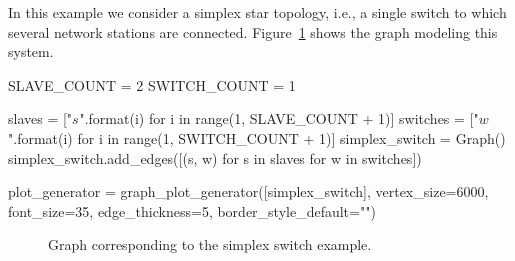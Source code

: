 \documentclass[times,a4paper,10pt,twocolumn]{article}
\theoremstyle{definition}
\theoremstyle{definition}
\theoremstyle{plain}
\begin{document}
In this example we consider a simplex star topology, i.e., a single switch to
which several network stations are connected. Figure~\ref{fig:simplex-switch}
shows the graph modeling this system.


\begin{sagesilent}

SLAVE_COUNT = 2
SWITCH_COUNT = 1

slaves = ["$s_{}$".format(i) for i in range(1, SLAVE_COUNT + 1)]
switches = ["$w_{}$".format(i) for i in range(1, SWITCH_COUNT + 1)]
simplex_switch = Graph()
simplex_switch.add_edges([(s, w) for s in slaves for w in switches])

plot_generator = graph_plot_generator([simplex_switch], vertex_size=6000,
    font_size=35, edge_thickness=5, border_style_default="")
\end{sagesilent}

\begin{figure}
\centering
{}
\caption{Graph corresponding to the simplex switch example.}
\label{fig:simplex-switch}
\end{figure}
\end{document}
